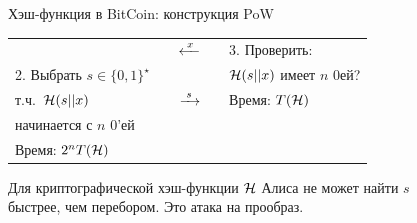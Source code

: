 \documentclass[usenames,dvipsnames,8pt,aspectratio=169]{beamer}
\begin{document}
\begin{frame}{Хэш-функция в  BitCoin: конструкция PoW}
\begin{tabular}{l c c c l}
		&  & \Huge $\xleftarrow{\mkern5mu x \mkern5mu}$ & &  3. Проверить: \\ [2pt]
		2. Выбрать $s \in \{0,1\}^\star$   & & &  & $\mathcal{H}(s||x)$  имеет $n$ 0ей?  \\[-6pt]
		т.ч.\ $\mathcal{H}(s||x)$ & & \Huge $\xrightarrow{\mkern5mu s \mkern5mu}$  &  &  {\color{Orange}  Время: $T(\mathcal{H}) $}  \\
		начинается с $n$ 0'ей & & &  &  \\[4pt]
		{\color{Orange}  Время: $2^n T(\mathcal{H}) $} & & &  & 
	\end{tabular}

\vspace{15pt}
Для криптографической хэш-функции $\mathcal{H}$ Алиса не может найти $s$ \\ быстрее, чем перебором. Это атака на прообраз. 
\end{frame}
\end{document}
